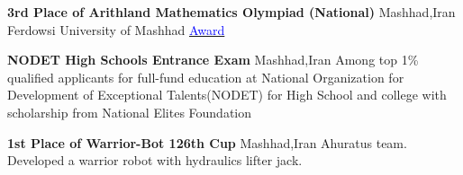 {\textbf{3rd Place of Arithland Mathematics Olympiad (National) }}
{Mashhad,Iran}
{Ferdowsi University of Mashhad}
{\href{https://drive.google.com/file/d/1m13vduTQe1rsCELSdiigq0-Qgep3Pecu/view?usp=sharing}{\textcolor{blue}{Award}}}
{}

{\textbf{NODET High Schools Entrance Exam}}
{Mashhad,Iran}
{}
{}
{
Among top 1\% qualified applicants for full-fund education at National Organization for Development of Exceptional Talents(NODET) for High School and college with scholarship from National Elites Foundation
}

{\textbf{1st Place of Warrior-Bot 126th Cup }}
{Mashhad,Iran}
{}
{}
{
   Ahuratus team. Developed a warrior robot with hydraulics lifter jack.
}

